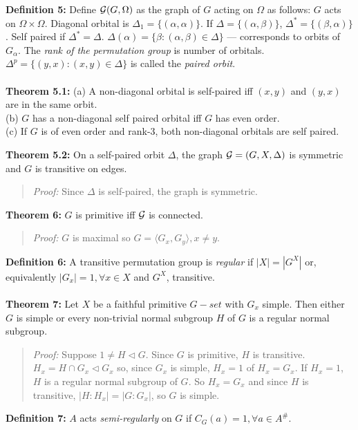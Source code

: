 {\bf Definition 5:}
Define ${\cal G}(G, \Omega )$ as the graph of $G$ acting on $\Omega$ as follows:
$G$ acts on $\Omega \times \Omega$.  Diagonal orbital is
$\Delta_1 = \{ (\alpha , \alpha )\}$. If $\Delta = \{ (\alpha , \beta ) \}$,
$\Delta^*= \{ (\beta, \alpha) \}$.  Self paired if $\Delta^* = \Delta$.
$\Delta(\alpha)= \{ \beta : (\alpha , \beta ) \in \Delta \}$ --- corresponds to 
orbits of $G_{\alpha}$. The \emph{rank of the permutation group} is number of orbitals.
$\Delta^p= \{ (y,x): (x, y) \in \Delta \}$ is called the \emph{paired orbit}.
\\
\\
{\bf Theorem 5.1:} 
(a) A non-diagonal orbital is self-paired iff $(x,y)$ and $(y,x)$ are in the same orbit.\\
(b) $G$ has a non-diagonal self paired orbital iff $G$ has even order. \\
(c) If $G$ is of even order and rank-3, both non-diagonal orbitals are self paired.
\begin{quote}
\end{quote}
{\bf Theorem 5.2:}
On a self-paired orbit $\Delta$, the graph ${\cal G}=(G, X,\Delta)$ is 
symmetric and $G$ is transitive on edges.
\begin{quote}
\emph{Proof:}  
Since $\Delta$ is self-paired, the graph is symmetric.  
\end{quote}
{\bf Theorem 6:}
$G$ is primitive iff ${\cal G}$ is connected.
\begin{quote}
\emph{Proof:}  
$G$ is maximal so $G= \langle G_x , G_y \rangle , x \ne y$.
\end{quote}
{\bf Definition 6:}
A transitive permutation group is \emph{regular} if $|X|= |G^X|$ or, equivalently 
$|G_x|=1, \forall x \in X$ and $G^X$, transitive.
\\
\\
{\bf Theorem 7:}
Let $X$ be a faithful primitive $G-set$ with $G_x$ simple.  Then either $G$ is simple or
every non-trivial normal subgroup $H$ of $G$ is a regular normal subgroup.
\begin{quote}
\emph{Proof:}  
Suppose $1 \ne H \lhd G$.  Since $G$ is primitive, $H$ is transitive.  $H_x= H \cap G_x \lhd G_x$
so, since $G_x$ is simple,  $H_x = 1$ of $H_x= G_x$.  If $H_x=1$, $H$ is a regular normal subgroup
of $G$.  So $H_x = G_x$ and since $H$ is transitive, $|H:H_x|= |G:G_x|$, so $G$ is simple.
\end{quote}
{\bf Definition 7:} $A$ acts \emph{semi-regularly} on $G$ if $C_G(a)=1, \forall a \in A^{\#}$.  
\\
